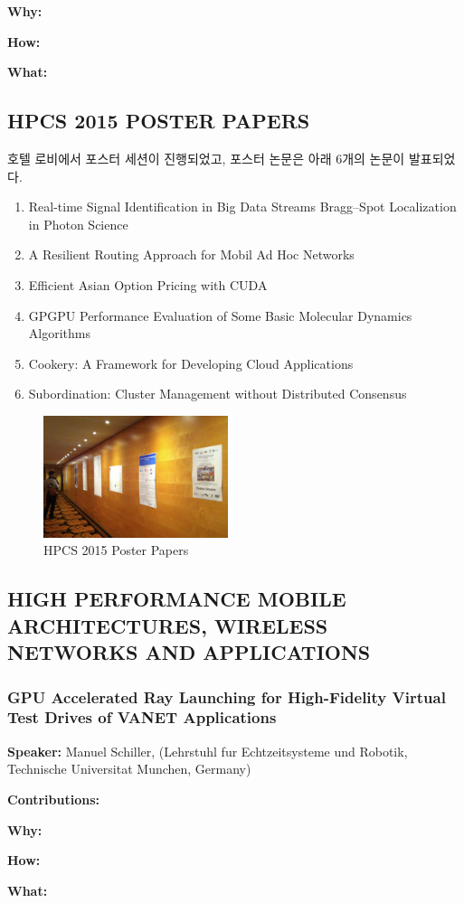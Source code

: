 \documentclass[twocolumn]{article}
\newcommand{\be}{\begin{enumerate}}
\newcommand{\ee}{\end{enumerate}}
\newcommand{\ii}{\item}
\begin{document}
\noindent
\textbf{Why:}  

\noindent
\textbf{How:}  

\noindent
\textbf{What:}  

\subsection{HPCS 2015 POSTER PAPERS}
호텔 로비에서 포스터 세션이 진행되었고, 포스터 논문은 아래 6개의 논문이 발표되었다.  
\be
\ii Real-time Signal Identification in Big Data Streams Bragg–Spot Localization in Photon Science
\ii A Resilient Routing Approach for Mobil Ad Hoc Networks
\ii Efficient Asian Option Pricing with CUDA
\ii GPGPU Performance Evaluation of Some Basic Molecular Dynamics Algorithms
\ii Cookery: A Framework for Developing Cloud Applications
\ii Subordination: Cluster Management without Distributed Consensus
\ee

\begin{figure}[htb]
        \centering
        \includegraphics[width=0.48\textwidth]{posters.png}
        \caption{HPCS 2015 Poster Papers}
        \label{fig:posters}
\end{figure}

\subsection{HIGH PERFORMANCE MOBILE ARCHITECTURES, WIRELESS NETWORKS AND APPLICATIONS}
\subsubsection{GPU Accelerated Ray Launching for High-Fidelity Virtual Test Drives of VANET Applications}
\textbf{Speaker:} Manuel Schiller, (Lehrstuhl fur Echtzeitsysteme und Robotik, Technische Universitat Munchen, Germany)

\noindent
\textbf{Contributions:}  

\noindent
\textbf{Why:}  

\noindent
\textbf{How:}  

\noindent
\textbf{What:}  
\end{document}
